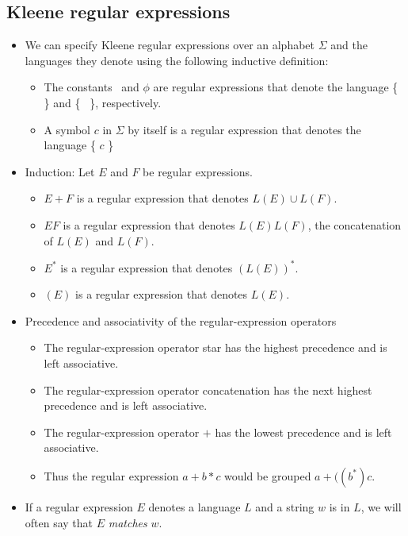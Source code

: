 \documentclass[]{article}
\begin{document}
  \subsection*{Kleene regular expressions}
    \begin{itemize}
      \item We can specify Kleene regular expressions over an alphabet $\Sigma$
            and the languages they denote using the following inductive
            definition:
        \begin{itemize}
          \item The constants \textepsilon \, and $\phi$ are regular
                expressions that denote the language \{ \textepsilon \, \} and
                \{ \, \}, respectively.
          \item A symbol $c$ in $\Sigma$ by itself is a regular expression that
                denotes the language \{ $c$ \}
        \end{itemize}
      \item Induction: Let $E$ and $F$ be regular expressions.
        \begin{itemize}
          \item $E + F$ is a regular expression that denotes $L(E) \cup L(F)$.
          \item $EF$ is a regular expression that denotes $L(E)L(F)$, the
                concatenation of $L(E)$ and $L(F)$.
          \item $E^*$ is a regular expression that denotes $(L(E))^*$.
          \item $(E)$ is a regular expression that denotes $L(E)$.
        \end{itemize}
      \item Precedence and associativity of the regular-expression operators
        \begin{itemize}
          \item The regular-expression operator star has the highest precedence
                and is left associative.
          \item The regular-expression operator concatenation has the next
                highest precedence and is left associative.
          \item The regular-expression operator $+$ has the lowest precedence
                and is left associative.
          \item Thus the regular expression $a + b * c$ would be grouped $a + ((
                b^*)c$.
        \end{itemize}
      \item If a regular expression $E$ denotes a language $L$ and a string $w$
            is in $L$, we will often say that $E$ \emph{matches} $w$.
    \end{itemize}
\end{document}
